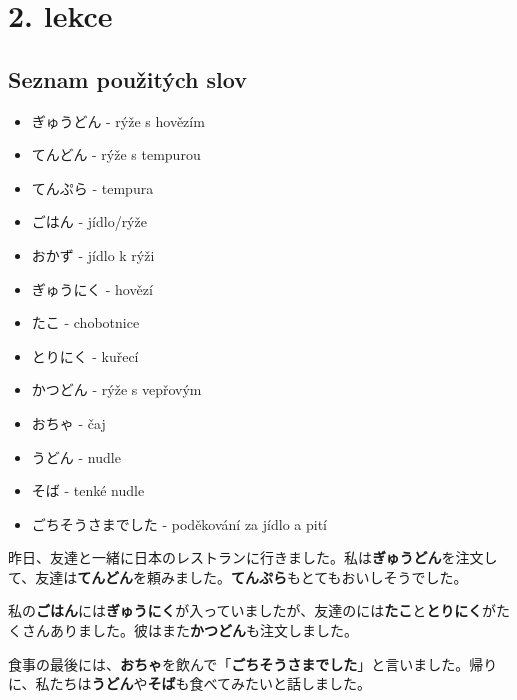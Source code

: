 \section{2. lekce}

\subsection*{Seznam použitých slov}

\begin{itemize}
    \item ぎゅうどん - rýže s hovězím
    \item てんどん - rýže s tempurou
    \item てんぷら - tempura
    \item ごはん - jídlo/rýže
    \item おかず - jídlo k rýži
    \item ぎゅうにく - hovězí
    \item たこ - chobotnice
    \item とりにく - kuřecí
    \item かつどん - rýže s vepřovým
    \item おちゃ - čaj
    \item うどん - nudle
    \item そば - tenké nudle
    \item ごちそうさまでした - poděkování za jídlo a pití
\end{itemize}

昨日、友達と一緒に日本のレストランに行きました。私は\textbf{ぎゅうどん}を注文して、友達は\textbf{てんどん}を頼みました。\textbf{てんぷら}もとてもおいしそうでした。

私の\textbf{ごはん}には\textbf{ぎゅうにく}が入っていましたが、友達のには\textbf{たこ}と\textbf{とりにく}がたくさんありました。彼はまた\textbf{かつどん}も注文しました。

食事の最後には、\textbf{おちゃ}を飲んで「\textbf{ごちそうさまでした}」と言いました。帰りに、私たちは\textbf{うどん}や\textbf{そば}も食べてみたいと話しました。
